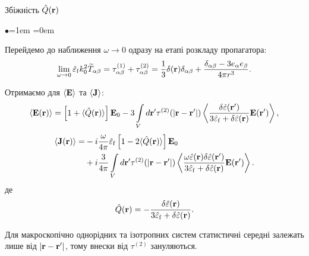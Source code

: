 \documentclass[10pt]{beamer}
\begin{document}
\begin{frame}{Збіжність $\hat{Q}({\bf r})$}
\footnotesize

\begin{list}{$\bullet$}{\leftmargin=1em \itemindent=0em}
\item
Перейдемо до наближення $\omega \to 0$ одразу на етапі розкладу пропагатора:
\begin{equation}\label{eq:prop_longwave}
	\lim\limits_{\omega \to 0} \hat{\varepsilon}_{\rm f} k_0^2  \widetilde{T}_{\alpha\beta} = \tau_{\alpha\beta}^{(1)} + \tau_{\alpha\beta}^{(2)} =
	\frac{1}{3} \delta({\bf r}) \delta_{\alpha\beta} + \frac{\delta_{\alpha\beta} - 3e_\alpha e_\beta}{4\pi r^3}.
\end{equation}

\item
Отримаємо для $\langle {\bf E} \rangle$ та $\langle {\bf J} \rangle$:
\begin{equation}\label{eq:E-averaged-direct}
\langle {\bf E}({\bf r}) \rangle = 
\left[ 1 + \langle \hat{Q}({\bf r}) \rangle \right] {\bf E}_0 
- 3 \int\limits_V d{\bf r}' \tau^{(2)} (|{\bf r} - {\bf r}'|) \left\langle \frac{\delta\hat{\varepsilon}({\bf r}')}{3\hat{\varepsilon}_{\rm f} + \delta\hat{\varepsilon}({\bf r})} {\bf E}({\bf r}') \right\rangle ,
\end{equation}
\begin{equation}\label{eq:C-averaged-direct}
\begin{split}
\langle {\bf J}({\bf r}) \rangle =& 
- i \frac{\omega}{4\pi} \hat{\varepsilon}_{\rm f} \left[ 1 - 2\langle \hat{Q}({\bf r}) \rangle \right] {\bf E}_0 \\
&+ i \frac{3}{4\pi} \int\limits_V d{\bf r}' \tau^{(2)} (|{\bf r} - {\bf r}'|) \left\langle \frac{\omega \hat{\varepsilon}({\bf r}) \delta\hat{\varepsilon}({\bf r}')}{3\hat{\varepsilon}_{\rm f} + \delta\hat{\varepsilon}({\bf r})} {\bf E}({\bf r}') \right\rangle.
\end{split}
\end{equation}
де
\begin{equation}\label{eq:Q}
\hat{Q}({\bf r}) = -\frac{\delta\hat{\varepsilon} ({\bf r})}{3\hat{\varepsilon}_{\rm f} + \delta\hat{\varepsilon}({\bf r})}.
\end{equation}

Для макроскопічно однорідних та ізотропних систем статистичні середні залежать лише від $|{\bf r} - {\bf r}'|$, тому внески від $\tau^{(2)}$ зануляються.

\end{list}

\end{frame}
\end{document}
